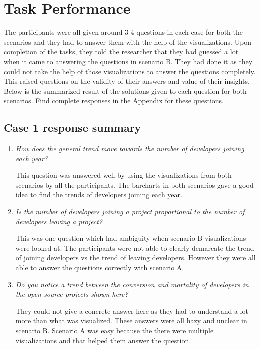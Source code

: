 \documentclass[double,12pt]{beavtex}
\begin{document}
\section{Task Performance}
The participants were all given around 3-4 questions in each case for both the scenarios and they had to answer them with the help of the visualizations. Upon completion of the tasks, they told the researcher that they had guessed a lot when it came to answering the questions in scenario B. They had done it as they could not take the help of those visualizations to answer the questions completely. This raised questions on the validity of their answers and value of their insights. Below is the summarized result of the solutions given to each question for both scenarios. Find complete responses in the Appendix for these questions.

\subsection{Case 1 response summary}

\begin{enumerate}
\item {\em How does the general trend move towards the number of developers joining each year?}


This question was answered well by using the visualizations from both scenarios by all the participants. The barcharts in both scenarios gave a good idea to find the trends of developers joining each year.


\item {\em Is the number of developers joining a project proportional to the number of developers leaving a project?}


This was one question which had ambiguity when scenario B visualizations were looked at. The participants were not able to clearly demarcate the trend of joining developers vs the trend of leaving developers. However they were all able to answer the questions correctly with scenario A.


\item {\em Do you notice a trend between the conversion and mortality of developers in the open source projects shown here?}


They could not give a concrete answer here as they had to understand a lot more than what was visualized. These answers were all hazy and unclear in scenario B. Scenario A was easy because the there were multiple visualizations and that helped them answer the question.
\end{enumerate}
\end{document}
